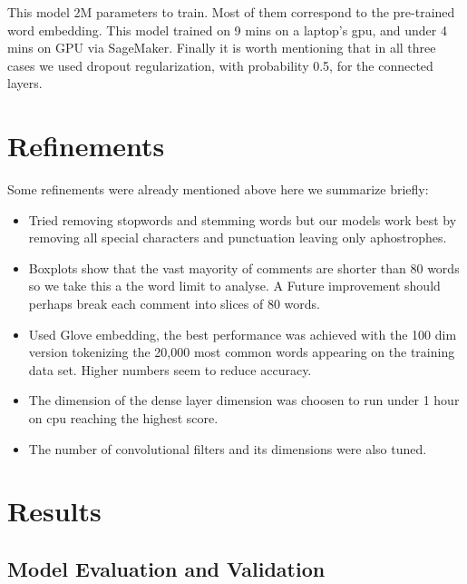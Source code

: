 \documentclass{report}
\begin{document}
This model 2M parameters to train. Most of them correspond to the pre-trained word embedding. This model trained on 9 mins
on a laptop's gpu, and under 4 mins on GPU via SageMaker. Finally it is worth mentioning that in all three cases 
we used dropout regularization, with probability 0.5, for the connected layers.

\section{Refinements}

Some refinements were already mentioned above here we summarize briefly:
\begin{itemize}
\item Tried removing stopwords and stemming words but our models work best by removing all special 
characters and punctuation leaving only aphostrophes. 
\item Boxplots show that the vast mayority of comments are shorter than 80 words so we take this a the word 
limit to analyse. A Future improvement should perhaps break each comment into slices of 80 words. 
\item Used Glove embedding, the best performance was achieved with the 100 dim version tokenizing the 
20,000 most common words appearing on the training data set. Higher numbers seem to reduce accuracy. 
\item The dimension of the dense layer dimension was choosen to run under 1 hour on cpu reaching the highest score. 
\item The number of convolutional filters and its dimensions were also tuned. 
\end{itemize}

\section{Results} 


\subsection{Model Evaluation and Validation}
\end{document}
